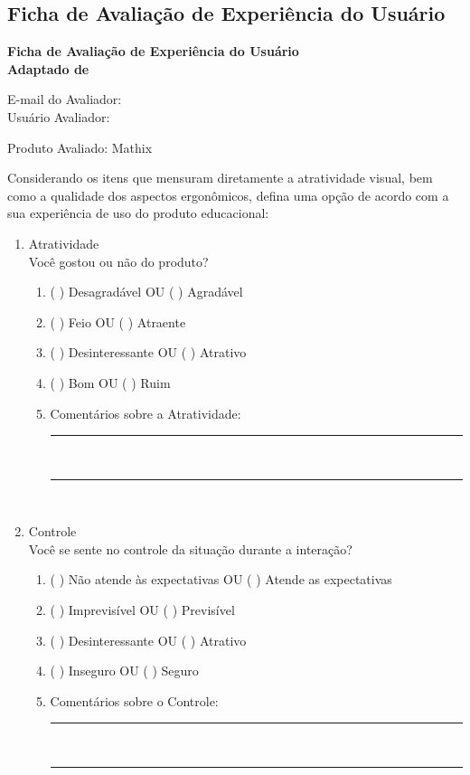 \begin{apendicesenv}
\chapter{Ficha de Avaliação de Experiência do Usuário}


\begin{center}
\textbf{
Ficha de Avaliação de Experiência do Usuário\\
Adaptado de 
}
\end{center}
E-mail do Avaliador:\hrulefill \\
Usuário Avaliador: \hrulefill \\

\begin{center}
Produto Avaliado: Mathix    
\end{center}


Considerando os itens que mensuram diretamente a atratividade visual, bem como a qualidade dos aspectos ergonômicos, defina uma opção de acordo com a sua experiência de uso do produto educacional:





\begin{enumerate}
    
    \item Atratividade\\Você gostou ou não do produto?
    \begin{enumerate}
        \item ( ) Desagradável OU ( ) Agradável
        \item ( ) Feio OU ( ) Atraente
        \item ( ) Desinteressante OU ( ) Atrativo
        \item ( ) Bom OU ( ) Ruim
        \item Comentários sobre a Atratividade:\hrulefill \\     
        \rule{14cm}{.1pt}\\
        \rule{14cm}{.1pt}\\
            
    \end{enumerate}

    
    \item Controle\\Você se sente no controle da situação durante a interação?
    \begin{enumerate}
        \item ( ) Não atende às expectativas OU ( ) Atende as expectativas
        \item ( ) Imprevisível OU ( ) Previsível
        \item ( ) Desinteressante OU ( ) Atrativo
        \item ( ) Inseguro OU ( ) Seguro
        \item Comentários sobre o Controle:\hrulefill \\     
        \rule{14cm}{.1pt}\\
        \rule{14cm}{.1pt}\\
              

\end{enumerate}
\end{enumerate}
\end{apendicesenv}
